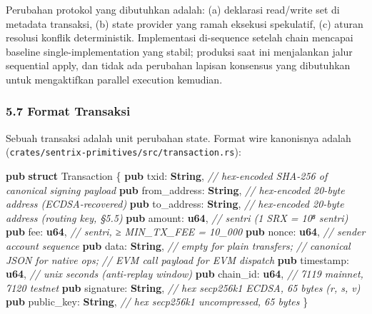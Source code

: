 \documentclass[11pt,a4paper]{article}
\providecommand{\NormalTok}[1]{#1}
\providecommand{\KeywordTok}[1]{\textbf{#1}}
\providecommand{\DataTypeTok}[1]{\textbf{#1}}
\providecommand{\CommentTok}[1]{\textit{#1}}
\providecommand{\OperatorTok}[1]{#1}
\newenvironment{Shaded}{}{}
\newenvironment{Highlighting}[1][]{\par\noindent\begin{minipage}{\linewidth}\ttfamily\small}{\end{minipage}\par}
\begin{document}
Perubahan protokol yang dibutuhkan adalah: (a) deklarasi read/write set di metadata transaksi, (b) state provider yang ramah eksekusi spekulatif, (c) aturan resolusi konflik deterministik. Implementasi di-sequence setelah chain mencapai baseline single-implementation yang stabil; produksi saat ini menjalankan jalur sequential apply, dan tidak ada perubahan lapisan konsensus yang dibutuhkan untuk mengaktifkan parallel execution kemudian.

\hypertarget{format-transaksi}{%
\subsubsection{5.7 Format Transaksi}\label{format-transaksi}}

Sebuah transaksi adalah unit perubahan state. Format wire kanonisnya adalah (\texttt{crates/sentrix-primitives/src/transaction.rs}):

\begin{Shaded}
\begin{Highlighting}[]
\KeywordTok{pub} \KeywordTok{struct}\NormalTok{ Transaction }\OperatorTok{\{}
    \KeywordTok{pub}\NormalTok{ txid}\OperatorTok{:}         \DataTypeTok{String}\OperatorTok{,}      \CommentTok{// hex{-}encoded SHA{-}256 of canonical signing payload}
    \KeywordTok{pub}\NormalTok{ from\_address}\OperatorTok{:} \DataTypeTok{String}\OperatorTok{,}      \CommentTok{// hex{-}encoded 20{-}byte address (ECDSA{-}recovered)}
    \KeywordTok{pub}\NormalTok{ to\_address}\OperatorTok{:}   \DataTypeTok{String}\OperatorTok{,}      \CommentTok{// hex{-}encoded 20{-}byte address (routing key, §5.5)}
    \KeywordTok{pub}\NormalTok{ amount}\OperatorTok{:}       \DataTypeTok{u64}\OperatorTok{,}         \CommentTok{// sentri (1 SRX = 10⁸ sentri)}
    \KeywordTok{pub}\NormalTok{ fee}\OperatorTok{:}          \DataTypeTok{u64}\OperatorTok{,}         \CommentTok{// sentri, ≥ MIN\_TX\_FEE = 10\_000}
    \KeywordTok{pub}\NormalTok{ nonce}\OperatorTok{:}        \DataTypeTok{u64}\OperatorTok{,}         \CommentTok{// sender account sequence}
    \KeywordTok{pub}\NormalTok{ data}\OperatorTok{:}         \DataTypeTok{String}\OperatorTok{,}      \CommentTok{// empty for plain transfers;}
                                   \CommentTok{// canonical JSON for native ops;}
                                   \CommentTok{// EVM call payload for EVM dispatch}
    \KeywordTok{pub}\NormalTok{ timestamp}\OperatorTok{:}    \DataTypeTok{u64}\OperatorTok{,}         \CommentTok{// unix seconds (anti{-}replay window)}
    \KeywordTok{pub}\NormalTok{ chain\_id}\OperatorTok{:}     \DataTypeTok{u64}\OperatorTok{,}         \CommentTok{// 7119 mainnet, 7120 testnet}
    \KeywordTok{pub}\NormalTok{ signature}\OperatorTok{:}    \DataTypeTok{String}\OperatorTok{,}      \CommentTok{// hex secp256k1 ECDSA, 65 bytes (r, s, v)}
    \KeywordTok{pub}\NormalTok{ public\_key}\OperatorTok{:}   \DataTypeTok{String}\OperatorTok{,}      \CommentTok{// hex secp256k1 uncompressed, 65 bytes}
\OperatorTok{\}}
\end{Highlighting}
\end{Shaded}
\end{document}
